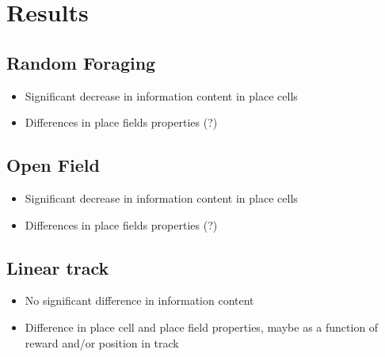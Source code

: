 
\chapter{Results} %

\label{Chapter4} %

\section{Random Foraging}
\label{chap4:sec:1:RF_1p}
\begin{itemize}
    \item Significant decrease in information content in place cells
    \item Differences in place fields properties (?)
\end{itemize}

\section{Open Field}
\label{chap4:sec:2:OF_1p}
\begin{itemize}
    \item Significant decrease in information content in place cells
    \item Differences in place fields properties (?)
\end{itemize}

\section{Linear track}
\label{chap4:sec:3:linear_track}
\begin{itemize}
    \item No significant difference in information content
    \item Difference in place cell and place field properties, maybe as a function of reward and/or position in track
\end{itemize}

